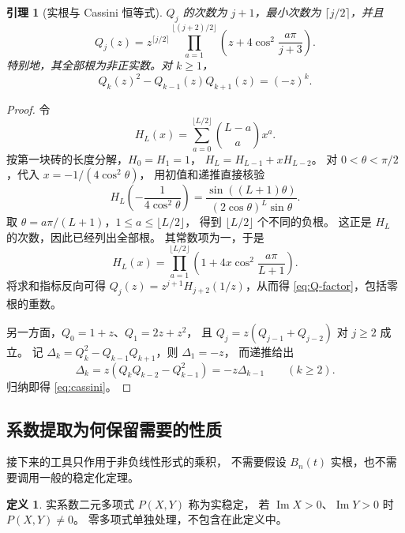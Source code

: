 \documentclass[UTF8,a4paper,11pt,fontset=none]{ctexart}
\numberwithin{equation}{section}
\theoremstyle{paperplain}
\newtheorem{lemma}[theorem]{引理}
\theoremstyle{definition}
\newtheorem{definition}[theorem]{定义}
\theoremstyle{remark}
\DeclareMathOperator{\Impart}{Im}
\begin{document}
\begin{lemma}[实根与 Cassini 恒等式]\label{lem:Q}
$Q_j$ 的次数为 $j+1$，最小次数为 $\lceil j/2\rceil$，并且
\begin{equation}\label{eq:Q-factor}
Q_j(z)=z^{\lceil j/2\rceil}
\prod_{a=1}^{\lfloor(j+2)/2\rfloor}
\left(z+4\cos^2\frac{a\pi}{j+3}\right).
\end{equation}
特别地，其全部根为非正实数。对 $k\ge1$，
\begin{equation}\label{eq:cassini}
Q_k(z)^2-Q_{k-1}(z)Q_{k+1}(z)=(-z)^k.
\end{equation}
\end{lemma}
\begin{proof}
令
\[
H_L(x)=\sum_{a=0}^{\lfloor L/2\rfloor}\binom{L-a}{a}x^a.
\]
按第一块砖的长度分解，$H_0=H_1=1$，
$H_L=H_{L-1}+xH_{L-2}$。
对 $0<\theta<\pi/2$，代入 $x=-1/(4\cos^2\theta)$，
用初值和递推直接核验
\[
H_L\left(-\frac1{4\cos^2\theta}\right)
=\frac{\sin((L+1)\theta)}{(2\cos\theta)^L\sin\theta}.
\]
取 $\theta=a\pi/(L+1)$，$1\le a\le\lfloor L/2\rfloor$，
得到 $\lfloor L/2\rfloor$ 个不同的负根。
这正是 $H_L$ 的次数，因此已经列出全部根。
其常数项为一，于是
\[
H_L(x)=\prod_{a=1}^{\lfloor L/2\rfloor}
\left(1+4x\cos^2\frac{a\pi}{L+1}\right).
\]
将求和指标反向可得 $Q_j(z)=z^{j+1}H_{j+2}(1/z)$，从而得
\eqref{eq:Q-factor}，包括零根的重数。

另一方面，$Q_0=1+z$、$Q_1=2z+z^2$，
且 $Q_j=z(Q_{j-1}+Q_{j-2})$ 对 $j\ge2$ 成立。
记 $\Delta_k=Q_k^2-Q_{k-1}Q_{k+1}$，则 $\Delta_1=-z$，
而递推给出
\[
\Delta_k=z(Q_kQ_{k-2}-Q_{k-1}^2)=-z\Delta_{k-1}\qquad(k\ge2).
\]
归纳即得 \eqref{eq:cassini}。
\end{proof}

\subsection{系数提取为何保留需要的性质}
接下来的工具只作用于非负线性形式的乘积，
不需要假设 $B_n(t)$ 实根，也不需要调用一般的稳定化定理。

\begin{definition}
实系数二元多项式 $P(X,Y)$ 称为实稳定，
若 $\Impart X>0$、$\Impart Y>0$ 时 $P(X,Y)\ne0$。
零多项式单独处理，不包含在此定义中。
\end{definition}
\end{document}
